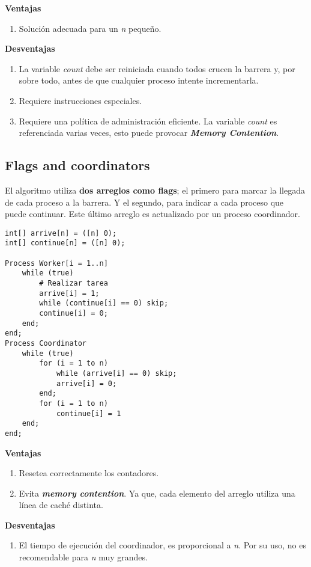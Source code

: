 \documentclass[a4paper, 10pt]{report}
\begin{document}
\textbf{Ventajas}
\begin{enumerate}
	\item Solución adecuada para un \emph{n} pequeño.
\end{enumerate}

\textbf{Desventajas}
\begin{enumerate}
	\item La variable \emph{count} debe ser reiniciada cuando todos crucen la barrera y, por sobre todo, antes de que cualquier proceso intente incrementarla.
	\item Requiere instrucciones especiales.
	\item Requiere una política de administración eficiente. La variable \emph{count} es referenciada varias veces, esto puede provocar \textbf{\emph{Memory Contention}}.
\end{enumerate}

\subsection{Flags and coordinators}

El algoritmo utiliza \textbf{dos arreglos como flags}; el primero para marcar la llegada de cada proceso a la barrera. Y el segundo, para indicar a cada proceso que puede continuar. Este último arreglo es actualizado por un proceso coordinador.

\begin{lstlisting}[multicols=2]
int[] arrive[n] = ([n] 0);
int[] continue[n] = ([n] 0);

Process Worker[i = 1..n]
	while (true)
		# Realizar tarea
		arrive[i] = 1;
		while (continue[i] == 0) skip;
		continue[i] = 0;
	end;
end;
Process Coordinator
	while (true)
		for (i = 1 to n)
			while (arrive[i] == 0) skip;
			arrive[i] = 0;
		end;
		for (i = 1 to n)
			continue[i] = 1
	end;
end;
\end{lstlisting}

\textbf{Ventajas}
\begin{enumerate}
	\item Resetea correctamente los contadores.
	\item Evita \textbf{\emph{memory contention}}. Ya que, cada elemento del arreglo utiliza una línea de caché distinta.
\end{enumerate}

\textbf{Desventajas}
\begin{enumerate}
	\item El tiempo de ejecución del coordinador, es proporcional a \emph{n}. Por su uso, no es recomendable para \emph{n} muy grandes.
\end{enumerate}
\end{document}
